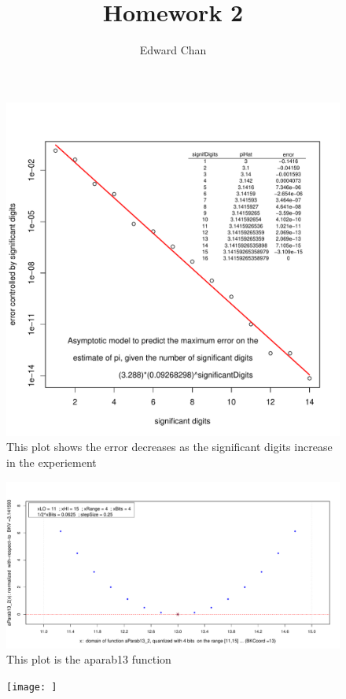 \documentclass[a4paper]{article}
\title{Homework 2}
\author{Edward Chan}
\begin{document}
    
\maketitle
    \begin{figure}[H]
    \begin{center}
        \includegraphics[scale=0.5]{fg_asym_pi_digits.pdf}
        \caption{This plot shows the error decreases as the
        significant digits increase in the experiement}
    \end{center}  
    \end{figure} 
     
    \begin{figure}[H]
        \begin{center}
            \includegraphics[scale=0.4]{fg_OF_aParab13_2_quant_exh.pdf}
            \caption{This plot is the aparab13 function}
        \end{center}
    \end{figure}

    \begin{figure}[H]
        \begin{center}
            \texttt{[image: ]}
        \end{center}
    \end{figure}
    
\end{document}
